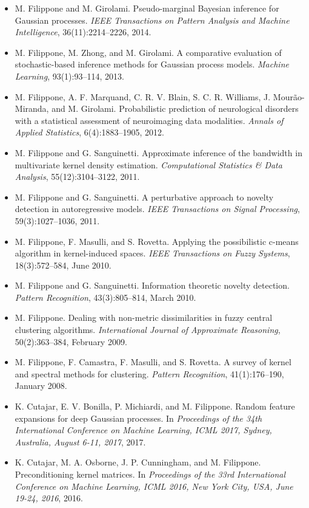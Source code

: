 \begin{itemize}\item  M. Filippone and M. Girolami. Pseudo-marginal Bayesian inference for Gaussian processes. \emph{IEEE Transactions on Pattern Analysis and Machine Intelligence}, 36(11):2214--2226, 2014.  
\item  M. Filippone, M. Zhong, and M. Girolami. A comparative evaluation of stochastic-based inference methods for Gaussian process models. \emph{Machine Learning}, 93(1):93--114, 2013.  
\item  M. Filippone, A. F. Marquand, C. R. V. Blain, S. C. R. Williams, J. Mour\~ao-Miranda, and M. Girolami. Probabilistic prediction of neurological disorders with a statistical assessment of neuroimaging data modalities. \emph{Annals of Applied Statistics}, 6(4):1883--1905, 2012.  
\item  M. Filippone and G. Sanguinetti. Approximate inference of the bandwidth in multivariate kernel density estimation. \emph{Computational Statistics \& Data Analysis}, 55(12):3104--3122, 2011.  
\item  M. Filippone and G. Sanguinetti. A perturbative approach to novelty detection in autoregressive models. \emph{IEEE Transactions on Signal Processing}, 59(3):1027--1036, 2011.  
\item  M. Filippone, F. Masulli, and S. Rovetta. Applying the possibilistic c-means algorithm in kernel-induced spaces. \emph{IEEE Transactions on Fuzzy Systems}, 18(3):572--584, June 2010.  
\item  M. Filippone and G. Sanguinetti. Information theoretic novelty detection. \emph{Pattern Recognition}, 43(3):805--814, March 2010.  
\item  M. Filippone. Dealing with non-metric dissimilarities in fuzzy central clustering algorithms. \emph{International Journal of Approximate Reasoning}, 50(2):363--384, February 2009.  
\item  M. Filippone, F. Camastra, F. Masulli, and S. Rovetta. A survey of kernel and spectral methods for clustering. \emph{Pattern Recognition}, 41(1):176--190, January 2008.  
\item  K. Cutajar, E. V. Bonilla, P. Michiardi, and M. Filippone. Random feature expansions for deep Gaussian processes. In \emph{Proceedings of the 34th International Conference on Machine Learning, ICML 2017, Sydney, Australia, August 6-11, 2017}, 2017.  
\item  K. Cutajar, M. A. Osborne, J. P. Cunningham, and M. Filippone. Preconditioning kernel matrices. In \emph{Proceedings of the 33rd International Conference on Machine Learning, ICML 2016, New York City, USA, June 19-24, 2016}, 2016.  

\end{itemize}
